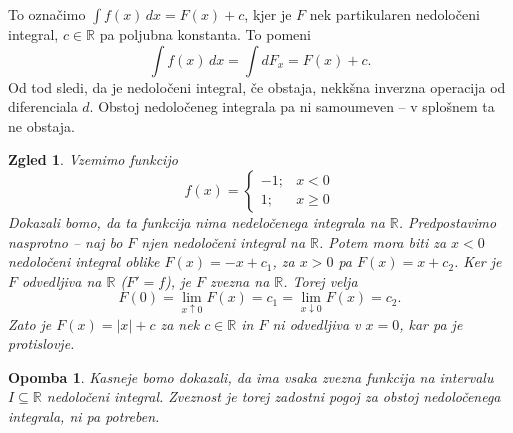 \documentclass[10pt, a4paper]{article}
\newtheorem*{opomba}{Opomba}
\newtheorem{zgled}[izr]{Zgled}
\newcommand{\R}{\mathbb {R}}
\newcommand{\rlimf}[3]{\lim_{#1 \downarrow #2} {#3}}
\newcommand{\llimf}[3]{\lim_{#1 \uparrow #2} {#3}}
\begin{document}
To označimo $\int f(x)\,dx = F(x) + c$, kjer je $F$ nek partikularen nedoločeni integral, $c \in \R$ pa poljubna konstanta.
To pomeni $$\int f(x)\,dx = \int dF_x = F(x) + c.$$
Od tod sledi, da je nedoločeni integral, če obstaja, nekkšna inverzna operacija od diferenciala $d$.
Obstoj nedoločeneg integrala pa ni samoumeven -- v splošnem ta ne obstaja.

\begin{zgled}
    Vzemimo funkcijo $$f(x) = \begin{cases}
        -1 ;& x < 0\\
        1 ;& x \geq 0
    \end{cases}$$
    Dokazali bomo, da ta funkcija nima nedeločenega integrala na $\R$.
    Predpostavimo nasprotno -- naj bo $F$ njen nedoločeni integral na $\R$.
    Potem mora biti za $x<0$ nedoločeni integral oblike $F(x) = - x + c_1$, za $x > 0$ pa $F(x) = x + c_2$.
    Ker je $F$ odvedljiva na $\R$ ($F' = f$), je $F$ zvezna na $\R$.
    Torej velja $$F(0) = \llimf{x}{0}{F(x)} = c_1 = \rlimf{x}{0}{F(x)} = c_2.$$
    Zato je $F(x) = |x| + c$ za nek $c \in \R$ in $F$ ni odvedljiva v $x = 0$, kar pa je protislovje.
\end{zgled}

\begin{opomba}
    Kasneje bomo dokazali, da ima vsaka zvezna funkcija na intervalu $I \subseteq \R$ nedoločeni integral.
    Zveznost je torej zadostni pogoj za obstoj nedoločenega integrala, ni pa potreben.
\end{opomba}
\end{document}

